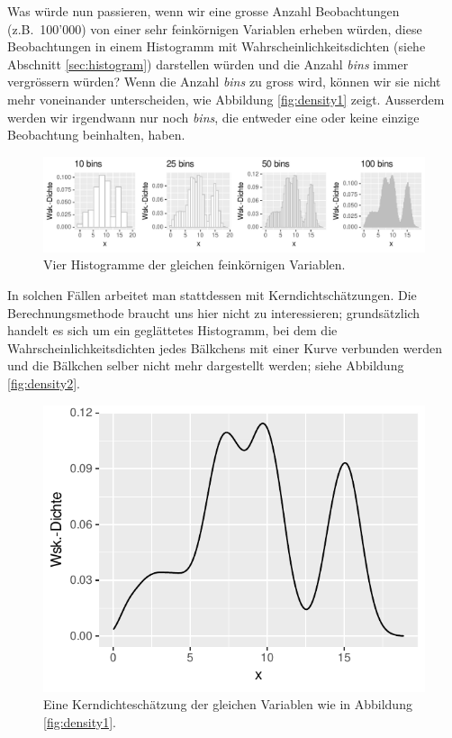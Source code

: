 \documentclass[oneside, 10pt]{book}\usepackage[]{graphicx}\usepackage[]{xcolor}
\newenvironment{knitrout}{}{} %
\begin{document}
Was würde nun passieren, wenn
wir eine grosse Anzahl Beobachtungen (z.B.\ 100'000) von einer sehr feinkörnigen
Variablen erheben würden, diese Beobachtungen in einem
Histogramm mit Wahrscheinlichkeitsdichten (siehe Abschnitt \ref{sec:histogram}) darstellen würden
und die Anzahl \textit{bins} immer vergrössern würden?
Wenn die Anzahl \textit{bins} zu gross wird, können wir sie nicht
mehr voneinander unterscheiden, wie Abbildung \ref{fig:density1} zeigt.
Ausserdem werden wir irgendwann nur noch \textit{bins}, die entweder
eine oder keine einzige Beobachtung beinhalten, haben.

\begin{knitrout}
\color{fgcolor}\begin{figure}[tp]

{\centering \includegraphics[width=\textwidth]{figs/unnamed-chunk-112-1} 

}

\caption{Vier Histogramme der gleichen feinkörnigen Variablen.\label{fig:density1}}\label{fig:unnamed-chunk-112}
\end{figure}

\end{knitrout}

In solchen Fällen arbeitet man stattdessen mit Kerndichtschätzungen.
Die Berechnungsmethode braucht uns hier nicht zu interessieren; grundsätzlich
handelt es sich um ein geglättetes Histogramm, bei dem die Wahrscheinlichkeitsdichten
jedes Bälkchens mit einer Kurve verbunden werden und die Bälkchen selber nicht mehr dargestellt werden; siehe Abbildung \ref{fig:density2}.

\begin{knitrout}
\color{fgcolor}\begin{figure}[tp]

{\centering \includegraphics[width=.4\textwidth]{figs/unnamed-chunk-113-1} 

}

\caption{Eine Kerndichteschätzung der gleichen Variablen wie in Abbildung \ref{fig:density1}.\label{fig:density2}}\label{fig:unnamed-chunk-113}
\end{figure}

\end{knitrout}
\end{document}

